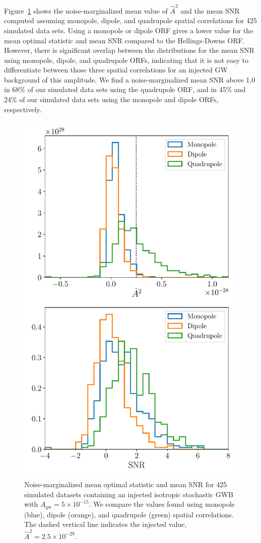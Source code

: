 \documentclass[twocolumn,aps,prd,superscriptaddress]{revtex4-1}
\newcommand{\Agw}{\ensuremath{A_\mathrm{gw}}}
\begin{document}
Figure~\ref{fig:os_ORF} shows the noise-marginalized mean value of $\hat{A}^2$ and the mean SNR 
computed assuming monopole, dipole, and quadrupole spatial correlations 
for 425 simulated data sets. Using a monopole or dipole ORF 
gives a lower value for the mean optimal statistic and mean SNR compared to the 
Hellings-Downs ORF. 
However, there is significant overlap between the distributions for the mean SNR using 
monopole, dipole, and quadrupole ORFs, indicating that it is not easy to differentiate 
between those three spatial correlations for an injected GW background of this amplitude. 
We find a noise-marginalized mean SNR above 1.0 in 68\% of our simulated data sets 
using the quadrupole ORF, and in 45\% and 24\% of our simulated data sets 
using the monopole and dipole ORFs, respectively.
\begin{figure}[htb]
	\includegraphics[width=0.95\columnwidth]{plots/os_datasetstats_5e-15_ORF.pdf}
	\caption{Noise-marginalized mean optimal statistic and mean SNR for 425 simulated datasets 
			containing an injected isotropic stochastic GWB with $\Agw = 5\times10^{-15}$. 
			We compare the values found using monopole (blue), dipole (orange), 
			and quadrupole (green) spatial correlations. 
			The dashed vertical line indicates the injected value, $\hat{A}^2 = 2.5 \times 10^{-29}$.}
	\label{fig:os_ORF}
\end{figure}
\end{document}
